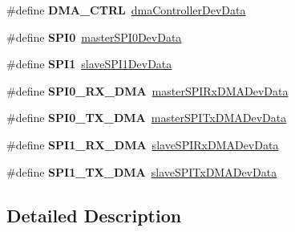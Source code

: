 \begin{DoxyCompactItemize}
\item 
\hypertarget{group___dev_ala_ga8a7d92a4f5077c21611200903b7fe8b6}{\#define {\bfseries D\-M\-A\-\_\-\-C\-T\-R\-L}~\hyperlink{group___log_dev_dat_str_ptr_gadcb3f32e1d6cb09fb77c28128d59c7f4}{dma\-Controller\-Dev\-Data}}\label{group___dev_ala_ga8a7d92a4f5077c21611200903b7fe8b6}

\item 
\hypertarget{group___dev_ala_gaf26e39c91b262cc480085abcc450d3d5}{\#define {\bfseries S\-P\-I0}~\hyperlink{group___log_dev_dat_str_ptr_ga5813253b5d8cbea8134608f6bcc99819}{master\-S\-P\-I0\-Dev\-Data}}\label{group___dev_ala_gaf26e39c91b262cc480085abcc450d3d5}

\item 
\hypertarget{group___dev_ala_gad483be344a28ac800be8f03654a9612f}{\#define {\bfseries S\-P\-I1}~\hyperlink{group___log_dev_dat_str_ptr_gad8ac5eb288b57c78161b4c027463a541}{slave\-S\-P\-I1\-Dev\-Data}}\label{group___dev_ala_gad483be344a28ac800be8f03654a9612f}

\item 
\hypertarget{group___dev_ala_ga4b60dc7b1d25575694205eb77b247a94}{\#define {\bfseries S\-P\-I0\-\_\-\-R\-X\-\_\-\-D\-M\-A}~\hyperlink{group___log_dev_dat_str_ptr_gab6ca91dbd43f844f187227a060a0bb77}{master\-S\-P\-I\-Rx\-D\-M\-A\-Dev\-Data}}\label{group___dev_ala_ga4b60dc7b1d25575694205eb77b247a94}

\item 
\hypertarget{group___dev_ala_ga16c2fa53911827e6da3756d19c393666}{\#define {\bfseries S\-P\-I0\-\_\-\-T\-X\-\_\-\-D\-M\-A}~\hyperlink{group___log_dev_dat_str_ptr_gafd0056caf5103bca68a726f4f8d7b4c3}{master\-S\-P\-I\-Tx\-D\-M\-A\-Dev\-Data}}\label{group___dev_ala_ga16c2fa53911827e6da3756d19c393666}

\item 
\hypertarget{group___dev_ala_gae55187601e1fa92bb33aba696294ba31}{\#define {\bfseries S\-P\-I1\-\_\-\-R\-X\-\_\-\-D\-M\-A}~\hyperlink{group___log_dev_dat_str_ptr_ga9f9c068038b7bb68fa3a2e6b426ab473}{slave\-S\-P\-I\-Rx\-D\-M\-A\-Dev\-Data}}\label{group___dev_ala_gae55187601e1fa92bb33aba696294ba31}

\item 
\hypertarget{group___dev_ala_ga553e31a50427c5ca50bb43c999d5bb98}{\#define {\bfseries S\-P\-I1\-\_\-\-T\-X\-\_\-\-D\-M\-A}~\hyperlink{group___log_dev_dat_str_ptr_ga4b24fc4b941fe265cc0c37fc63716411}{slave\-S\-P\-I\-Tx\-D\-M\-A\-Dev\-Data}}\label{group___dev_ala_ga553e31a50427c5ca50bb43c999d5bb98}

\end{DoxyCompactItemize}


\subsection{Detailed Description}
